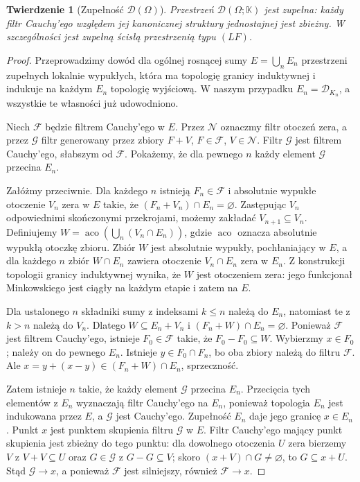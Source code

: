 \documentclass[11pt,a4paper]{article}
\numberwithin{equation}{section}
\theoremstyle{plain}
\newtheorem{twierdzenie}{Twierdzenie}[section]
\theoremstyle{definition}
\theoremstyle{remark}
\newcommand{\K}{\mathbb K}
\begin{document}
\begin{twierdzenie}[Zupełność $\mathcal D(\Omega)$]
\label{thm:D-complete18}
Przestrzeń $\mathcal D(\Omega;\K)$ jest zupełna:
każdy filtr Cauchy'ego względem jej kanonicznej struktury
jednostajnej jest zbieżny. W szczególności jest zupełną
ścisłą przestrzenią typu $(LF)$.
\end{twierdzenie}
\begin{proof}
Przeprowadzimy dowód dla ogólnej rosnącej sumy
$E=\bigcup_nE_n$ przestrzeni zupełnych lokalnie wypukłych,
która ma topologię granicy induktywnej i indukuje na
każdym $E_n$ topologię wyjściową. W naszym przypadku
$E_n=\mathcal D_{K_n}$, a wszystkie te własności już
udowodniono.

Niech $\mathcal F$ będzie filtrem Cauchy'ego w $E$.
Przez $\mathcal N$ oznaczmy filtr otoczeń zera, a przez
$\mathcal G$ filtr generowany przez zbiory $F+V$,
$F\in\mathcal F$, $V\in\mathcal N$. Filtr $\mathcal G$
jest filtrem Cauchy'ego, słabszym od $\mathcal F$.
Pokażemy, że dla pewnego $n$ każdy element $\mathcal G$
przecina $E_n$.

Załóżmy przeciwnie. Dla każdego $n$ istnieją
$F_n\in\mathcal F$ i absolutnie wypukłe otoczenie
$V_n$ zera w $E$ takie, że
$(F_n+V_n)\cap E_n=\varnothing$. Zastępując $V_n$
odpowiednimi skończonymi przekrojami, możemy zakładać
$V_{n+1}\subseteq V_n$. Definiujemy
$W=\operatorname{aco}(\bigcup_n(V_n\cap E_n))$,
gdzie $\operatorname{aco}$ oznacza absolutnie wypukłą
otoczkę zbioru. Zbiór $W$ jest absolutnie wypukły,
pochłaniający w $E$, a dla każdego $n$ zbiór
$W\cap E_n$ zawiera otoczenie $V_n\cap E_n$ zera w $E_n$.
Z konstrukcji topologii granicy induktywnej wynika, że
$W$ jest otoczeniem zera: jego funkcjonał Minkowskiego
jest ciągły na każdym etapie i zatem na $E$.

Dla ustalonego $n$ składniki sumy z indeksami $k\le n$
należą do $E_n$, natomiast te z $k>n$ należą do $V_n$.
Dlatego $W\subseteq E_n+V_n$ i
$(F_n+W)\cap E_n=\varnothing$.
Ponieważ $\mathcal F$ jest filtrem Cauchy'ego, istnieje
$F_0\in\mathcal F$ takie, że $F_0-F_0\subseteq W$.
Wybierzmy $x\in F_0$; należy on do pewnego $E_n$.
Istnieje $y\in F_0\cap F_n$, bo oba zbiory należą do
filtru $\mathcal F$. Ale
$x=y+(x-y)\in(F_n+W)\cap E_n$, sprzeczność.

Zatem istnieje $n$ takie, że każdy element $\mathcal G$
przecina $E_n$. Przecięcia tych elementów z $E_n$
wyznaczają filtr Cauchy'ego na $E_n$, ponieważ topologia
$E_n$ jest indukowana przez $E$, a $\mathcal G$
jest Cauchy'ego. Zupełność $E_n$ daje jego granicę
$x\in E_n$. Punkt $x$ jest punktem skupienia filtru
$\mathcal G$ w $E$. Filtr Cauchy'ego mający punkt skupienia
jest zbieżny do tego punktu: dla dowolnego otoczenia
$U$ zera bierzemy $V$ z $V+V\subseteq U$ oraz
$G\in\mathcal G$ z $G-G\subseteq V$; skoro
$(x+V)\cap G\ne\varnothing$, to $G\subseteq x+U$.
Stąd $\mathcal G\to x$, a ponieważ $\mathcal F$ jest
silniejszy, również $\mathcal F\to x$.
\end{proof}
\end{document}
